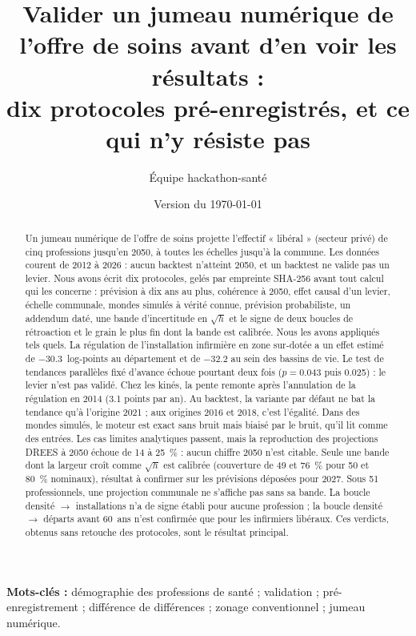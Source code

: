 \documentclass[11pt]{article}
\title{Valider un jumeau numérique de l'offre de soins avant d'en voir les résultats :\\
dix protocoles pré-enregistrés, et ce qui n'y résiste pas}
\author[1]{Équipe hackathon-santé}
\affil[1]{Projet « jumeau numérique de l'offre de soins », dépôt \texttt{hackathon-sante/v2}}
\date{Version du \today}
\begin{document}
\maketitle

\begin{abstract}
Un jumeau numérique de l'offre de soins projette l'effectif « libéral » (secteur privé) de cinq
professions jusqu'en 2050, à toutes les échelles jusqu'à la commune. Les données courent de 2012 à
2026 : aucun backtest n'atteint 2050, et un backtest ne valide pas un levier. Nous avons écrit dix
protocoles, gelés par empreinte SHA-256 avant tout calcul qui les concerne : prévision à dix ans au
plus, cohérence à 2050, effet causal d'un levier, échelle communale, mondes simulés à vérité connue,
prévision probabiliste, un addendum daté, une bande d'incertitude en $\sqrt h$ et le signe de deux boucles de rétroaction et le grain le plus fin dont la bande est calibrée. Nous les avons appliqués tels quels. La régulation de
l'installation infirmière en zone sur-dotée a un effet estimé de $\num{-30.3}$\mesure{}~log-points
au département et de $\num{-32.2}$\mesure{} au sein des bassins de vie. Le test de tendances
parallèles fixé d'avance échoue pourtant deux fois ($p = \num{0.043}$\mesure{} puis
\num{0.025}\mesure{}) : le levier n'est pas validé. Chez les kinés, la pente remonte après
l'annulation de la régulation en 2014 (\num{3.1}\mesure{} points par an). Au backtest, la variante
par défaut ne bat la tendance qu'à l'origine 2021 ; aux origines 2016 et 2018, c'est l'égalité. Dans
des mondes simulés, le moteur est exact sans bruit mais biaisé par le bruit, qu'il lit comme des
entrées. Les cas limites analytiques passent, mais la reproduction des projections DREES à 2050
échoue de 14 à 25\mesure{}~\% : aucun chiffre 2050 n'est citable. Seule une bande dont la largeur
croît comme $\sqrt h$ est calibrée (couverture de 49 et 76\mesure{}~\% pour 50 et 80~\% nominaux),
résultat à confirmer sur les prévisions déposées pour 2027. Sous 51\mesure{} professionnels, une
projection communale ne s'affiche pas sans sa bande. La boucle densité $\to$ installations n'a de signe
établi pour aucune profession ; la boucle densité $\to$ départs avant 60~ans n'est confirmée que pour les
infirmiers libéraux. Ces verdicts, obtenus sans retouche des
protocoles, sont le résultat principal.
\end{abstract}
\noindent\textbf{Mots-clés :} démographie des professions de santé ; validation ; pré-enregistrement ;
différence de différences ; zonage conventionnel ; jumeau numérique.
\end{document}
